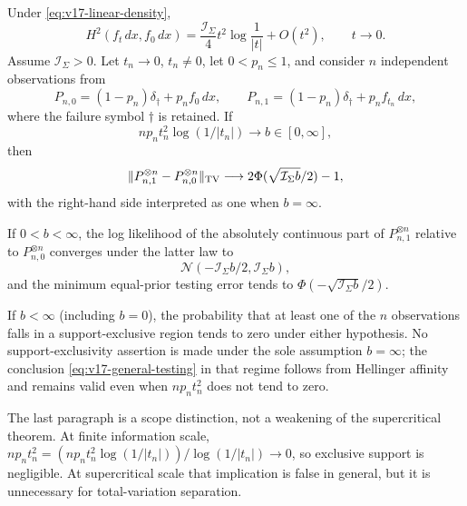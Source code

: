 \begin{theorem}
\label{thm:v17-boundary-information}
Under \eqref{eq:v17-linear-density},
\begin{equation}\label{eq:v17-hellinger}
 H^2(f_t\,dx,f_0\,dx)
 =\frac{\mathcal I_\Sigma}{4}t^2\log\frac1{|t|}+O(t^2),
 \qquad t\to0.
\end{equation}
Assume $\mathcal I_\Sigma>0$.  Let $t_n\to0$, $t_n\ne0$, let
$0<p_n\le1$, and consider $n$ independent observations from
\begin{equation}\label{eq:v17-thinning}
 P_{n,0}=(1-p_n)\delta_\dagger+p_nf_0\,dx,
 \qquad
 P_{n,1}=(1-p_n)\delta_\dagger+p_nf_{t_n}\,dx,
\end{equation}
where the failure symbol $\dagger$ is retained.  If
\begin{equation}\label{eq:v17-information-scale}
 np_nt_n^2\log(1/|t_n|)\longrightarrow b\in[0,\infty],
\end{equation}
then
\begin{equation}\label{eq:v17-general-testing}
 \|P_{n,1}^{\otimes n}-P_{n,0}^{\otimes n}\|_{\rm TV}
 \longrightarrow 2\Phi(\sqrt{\mathcal I_\Sigma b}/2)-1,
\end{equation}
with the right-hand side interpreted as one when $b=\infty$.

If $0<b<\infty$, the log likelihood of the absolutely continuous part of
$P_{n,1}^{\otimes n}$ relative to $P_{n,0}^{\otimes n}$ converges under
the latter law to
\begin{equation}\label{eq:v17-general-likelihood}
 \mathcal N(-\mathcal I_\Sigma b/2,\mathcal I_\Sigma b),
\end{equation}
and the minimum equal-prior testing error tends to
$\Phi(-\sqrt{\mathcal I_\Sigma b}/2)$.

If $b<\infty$ (including $b=0$), the probability that at least one of the
$n$ observations falls in a support-exclusive region tends to zero under
either hypothesis.  No support-exclusivity assertion is made under the
sole assumption $b=\infty$; the conclusion
\eqref{eq:v17-general-testing} in that regime follows from Hellinger
affinity and remains valid even when $np_nt_n^2$ does not tend to zero.
\end{theorem}

The last paragraph is a scope distinction, not a weakening of the
supercritical theorem.  At finite information scale,
$np_nt_n^2=(np_nt_n^2\log(1/|t_n|))/\log(1/|t_n|)\to0$, so exclusive
support is negligible.  At supercritical scale that implication is false
in general, but it is unnecessary for total-variation separation.


